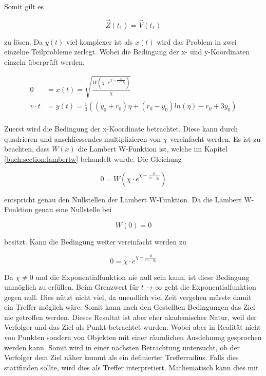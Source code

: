 Somit gilt es

\begin{equation*}
    \vec{Z}(t_1)=\vec{V}(t_1)
\end{equation*}

zu lösen. Da $y(t)$ viel komplexer ist als $x(t)$ wird das Problem in zwei einzelne Teilprobleme zerlegt. Wobei die Bedingung der x- und y-Koordinaten einzeln überprüft werden.

\begin{align*}
    0
    &=
    x(t)
    =
    \sqrt{\frac{W\left(\chi\cdot e^{\chi-\frac{4t}{r_0-y_0}}\right)}{\chi}}
    \\
    v \cdot t
    &=
    y(t)
    =
    \frac{1}{4}\left(\left(y_0+r_0\right)\eta+\left(r_0-y_0\right)ln\left(\eta\right)-r_0+3y_0\right)
    \\
\end{align*}

Zuerst wird die Bedingung der x-Koordinate betrachtet.
Diese kann durch quadrieren und anschliessendes multiplizieren von $\chi$ vereinfacht werden.
Es ist zu beachten, dass $W(x)$ die Lambert W-Funktion ist, welche im Kapitel \eqref{buch:section:lambertw} behandelt wurde.
Die Gleichung

\begin{equation}
    0
    =
    W\left(\chi\cdot e^{\chi-\frac{4t}{r_0-y_0}}\right)
\end{equation}


entspricht genau den Nullstellen der Lambert W-Funktion. Da die Lambert W-Funktion genau eine Nullstelle bei

\begin{equation*}
    W(0)=0
\end{equation*}

besitzt. Kann die Bedingung weiter vereinfacht werden zu

\begin{equation}
    0
    =
    \chi\cdot e^{\chi-\frac{4t}{r_0-y_0}}
\end{equation}

Da $\chi\neq0$ und die Exponentialfunktion nie null sein kann, ist diese Bedingung unmöglich zu erfüllen.
Beim Grenzwert für $t\rightarrow\infty$ geht die Exponentialfunktion gegen null.
Dies nützt nicht viel, da unendlich viel Zeit vergehen müsste damit ein Treffer möglich wäre.
Somit kann nach den Gestellten Bedingungen das Ziel nie getroffen werden.
Dieses Resultat ist aber eher akademischer Natur, weil der Verfolger und das Ziel als Punkt betrachtet wurden.
Wobei aber in Realität nicht von Punkten sondern von Objekten mit einer räumlichen Ausdehnung gesprochen werden kann.
Somit wird in einer nächsten Betrachtung untersucht, ob der Verfolger dem Ziel näher kommt als ein definierter Trefferradius.
Falls dies stattfinden sollte, wird dies als Treffer interpretiert.
Mathematisch kann dies mit

